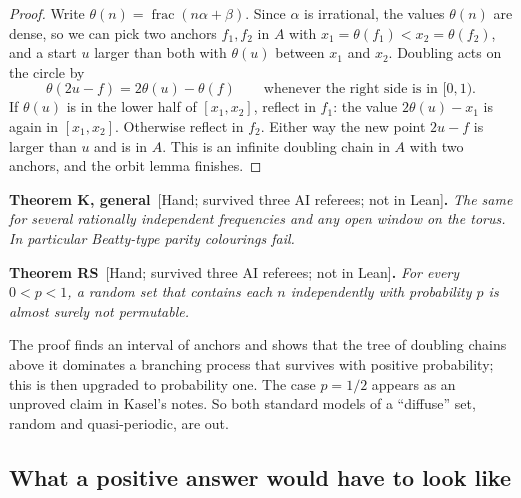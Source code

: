 \documentclass[11pt,letterpaper]{article}
\newcommand{\fr}{\operatorname{frac}}
\newcommand{\st}[1]{\textnormal{\textsf{\small[#1]}}}
\newenvironment{result}[2]%
  {\par\medskip\noindent\textbf{#1}\ \st{#2}\textbf{.}\enspace\itshape}%
  {\par\medskip}
\begin{document}
\begin{proof}
Write $\theta(n) = \fr(n\alpha+\beta)$. Since $\alpha$ is irrational, the values $\theta(n)$ are dense, so we
can pick two anchors $f_1, f_2$ in $A$ with $x_1 = \theta(f_1) < x_2 = \theta(f_2)$, and a start $u$ larger
than both with $\theta(u)$ between $x_1$ and $x_2$. Doubling acts on the circle by
\[ \theta(2u-f) = 2\theta(u) - \theta(f) \qquad\text{whenever the right side is in } [0,1). \]
If $\theta(u)$ is in the lower half of $[x_1,x_2]$, reflect in $f_1$: the value $2\theta(u)-x_1$ is again in
$[x_1,x_2]$. Otherwise reflect in $f_2$. Either way the new point $2u-f$ is larger than $u$ and is in $A$.
This is an infinite doubling chain in $A$ with two anchors, and the orbit lemma finishes.
\end{proof}

\begin{result}{Theorem K, general}{Hand; survived three AI referees; not in Lean}
The same for several rationally independent frequencies and any open window on the torus. In particular
Beatty-type parity colourings fail.
\end{result}

\begin{result}{Theorem RS}{Hand; survived three AI referees; not in Lean}
For every $0 < p < 1$, a random set that contains each $n$ independently with probability $p$ is almost
surely not permutable.
\end{result}

The proof finds an interval of anchors and shows that the tree of doubling chains above it dominates a
branching process that survives with positive probability; this is then upgraded to probability one. The
case $p = 1/2$ appears as an unproved claim in Kasel's notes. So both standard models of a ``diffuse'' set,
random and quasi-periodic, are out.

\subsection{What a positive answer would have to look like}
\end{document}
